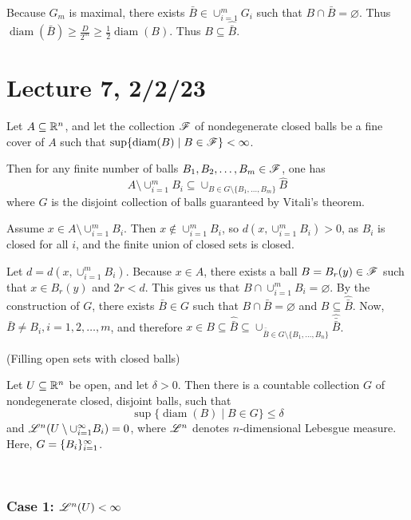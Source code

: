 \documentclass[x11names,reqno,14pt]{extarticle}
\newcommand{\seq}[2][\oo]{_{#2 = 1}^#1}
\newcommand{\cupi}[1][\oo]{\cup\seq[#1]{i}}
\DeclareMathOperator{\diam}{diam}
\begin{document}
Because $G_m$ is maximal, there exists $\bar{B} \in \cupi[m]G_i$ such that $B \cap\bar{B} = \varnothing$. Thus $\diam(\bar{B}) \geq \frac{D}{2^m} \geq \frac{1}{2}\diam(B)$. Thus $B \subseteq \hat{\bar{B}}$. 

\section*{Lecture 7, 2/2/23}

\cor

Let $A \subseteq \mathbb{R}^n$, and let the collection $\mathscr{F}$ of nondegenerate closed balls be a fine cover of $A$ such that $\sup\{\diam(B)\mid B\in\ms{F}\} < \oo$. 

Then for any finite number of balls $B_1, B_2, \dots, B_m\in\mathscr{F}$, one has
\[
A\setminus\cupi[m]B_i \subseteq \cup_{B\in G\setminus\{B_1, \dots, B_m\}}\hat{B}
\]
where $G$ is the disjoint collection of balls guaranteed by Vitali's theorem. 

\proof

Assume $x \in A\setminus\cupi[m]B_i$. Then $x\not\in\cupi[m]B_i$, so $d(x, \cupi[m]B_i) > 0$, as $B_i$ is closed for all $i$, and the finite union of closed sets is closed. 

Let $d = d(x, \cupi[m]B_i)$. Because $x \in A$, there exists a ball $B = B_r(y) \in \mathscr{F}$ such that $x\in B_r(y)$ and $2r<d$. This gives us that $B \cap \cupi[m]B_i = \varnothing$. By the construction of $G$, there exists $\bar{B} \in G$ such that $B \cap \bar{B} = \varnothing$ and $B \subseteq \hat{\bar{B}}$. Now, $\bar{B}\neq B_i, i = 1, 2, \dots, m$, and therefore $x \in B \subseteq\hat{\bar{B}}\subseteq \cup_{\bar{\bar{B}}\in G\setminus\{B_1, \dots, B_n\}}\hat{\bar{\bar{B}}}$. 

\thm (Filling open sets with closed balls)

Let $U \subseteq \mathbb{R}^n$ be open, and let $\delta > 0$. Then there is a countable collection $G$ of nondegenerate closed, disjoint balls, such that 
\[
\sup\{\diam(B) \mid B \in G\} \leq \delta
\]
and $\ms{L}^n(U\setminus\cupi B_i) = 0$, where $\mathscr{L}^n$ denotes $n$-dimensional Lebesgue measure. Here, $G = \{B_i\}\seq{i}$. 

\proof
\,

\subsubsection*{Case 1: $\mathscr{L}^n(U) < \infty$}
\end{document}
